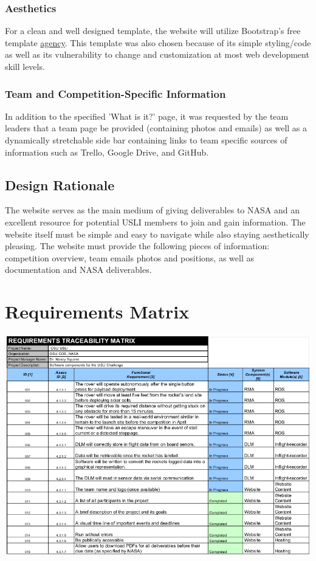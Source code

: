 \documentclass[onecolumn, draftclsnofoot,10pt, compsoc]{IEEEtran}
\begin{document}
\subsubsection{Aesthetics}
For a clean and well designed template, the website will utilize Bootstrap's free template \href{https://startbootstrap.com/template-overviews/agency/}{agency}. This template was also chosen because of its simple styling/code as well as its vulnerability to change and customization at most web development skill levels.

\subsubsection{Team and Competition-Specific Information}
In addition to the specified 'What is it?' page, it was requested by the team leaders that a team page be provided (containing photos and emails) as well as a dynamically stretchable side bar containing links to team specific sources of information such as Trello, Google Drive, and GitHub.
\subsection{Design Rationale}
The website serves as the main medium of giving deliverables to NASA and an excellent resource for potential USLI members to join and gain information. The website itself must be simple and easy to navigate while also staying aesthetically pleasing. The website must provide the following pieces of information: competition overview, team emails photos and positions, as well as documentation and NASA deliverables.
\section{Requirements Matrix}
\includegraphics[width=\textwidth]{reqMatrix}
\nocite{*}%

%
\end{document}
